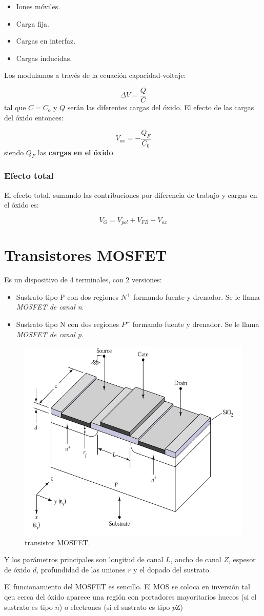 \begin{itemize}
	\item Iones móviles.
	\item Carga fija. 
	\item Cargas en interfaz.
	\item Cargas inducidas. 
\end{itemize}
Los modulamos a través de la ecuación capacidad-voltaje:

\begin{equation}
	\Delta V = \frac{Q}{C}
\end{equation}
tal que $C=C_o$ y $Q$ serán las diferentes cargas del óxido. El efecto de las cargas del óxido entonces:

\begin{equation}
	V_{ox} = - \frac{Q_F}{C_0}
\end{equation}
siendo $Q_F$ las \textbf{cargas en el óxido}. 

\subsubsection{Efecto total}

El efecto total, sumando las contribuciones por diferencia de trabajo y cargas en el óxido es:

\begin{equation}
	V_{G} = V_{pol} + V_{FB} - V_{ox}
\end{equation}

\section{Transistores MOSFET}



Es un dispositivo de 4 terminales, con 2 versiones: 
\begin{itemize}
	\item Sustrato tipo P con dos regiones $N^+$ formando fuente y drenador. Se le llama \textit{MOSFET de canal n}.
	\item Sustrato tipo N con dos regiones $P^+$ formando fuente y drenador. Se le llama \textit{MOSFET de canal p}.
\end{itemize}
\begin{figure}
	\includegraphics[width=0.6\linewidth]{Cuerpo/Ch_05/Figura-01.png}
	\caption{transistor MOSFET.}
	\label{Fig:05-01}
\end{figure}
Y los parámetros principales son longitud de canal $L$, ancho de canal $Z$, espesor de óxido $d$, profundidad de las uniones $r$ y el dopado del sustrato.

El funcionamiento del MOSFET es sencillo. El MOS se coloca en inversión tal qeu cerca del óxido aparece una región con portadores mayoritarios huecos (si el sustrato es tipo $n$) o electrones (si el sustrato es tipo $p$Z)

